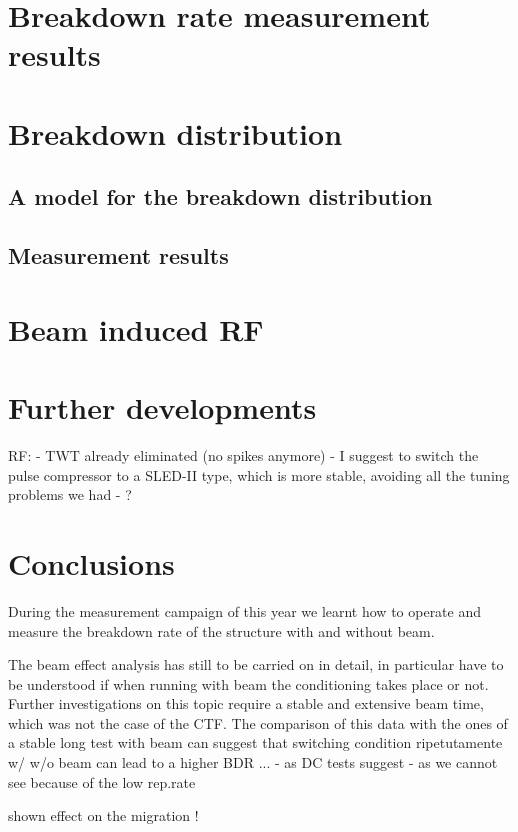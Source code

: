 \section[Breakdown rate measurement results]{Breakdown rate measurement results}



\section[Breakdown distribution]{Breakdown distribution}

\subsection[A model for the breakdown distribution]{A model for the breakdown distribution}

\subsection[Measurement results]{Measurement results}




\section[Beam induced RF]{Beam induced RF}






\section[Further developments]{Further developments}


RF:
- TWT already eliminated (no spikes anymore)
- I suggest to switch the pulse compressor to a SLED-II type, which is more stable, avoiding all the tuning problems we had
- ?


\section{Conclusions}

During the measurement campaign of this year we learnt how to operate and measure the breakdown rate of the structure with and without beam.

The beam effect analysis has still to be carried on in detail, in particular have to be understood if when running with beam the conditioning takes place or not. Further investigations on this topic require a stable and extensive beam time, which was not the case of the CTF. The comparison of this data with the ones of a stable long test with beam can suggest that switching condition ripetutamente w/ w/o beam can lead to a higher BDR ...
- as DC tests suggest
- as we cannot see because of the low rep.rate



shown effect on the migration !